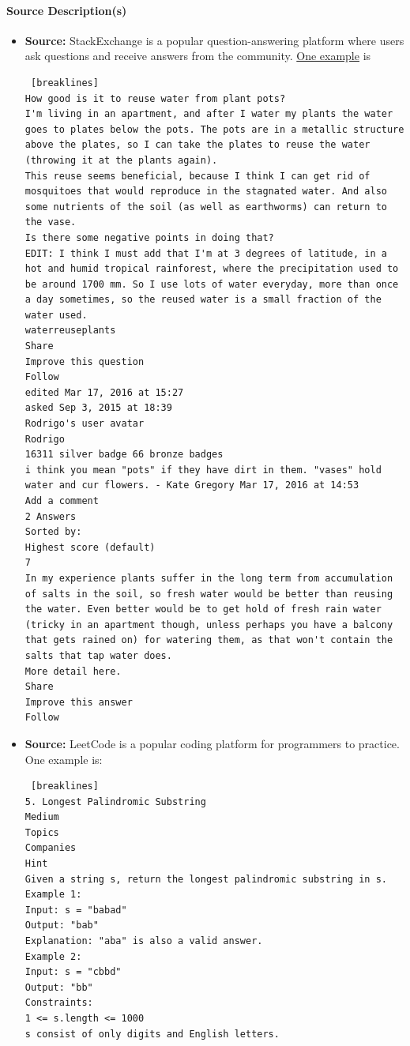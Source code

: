 \paragraph{Source Description(s)}
\begin{itemize}
\item \textbf{Source:} StackExchange is a popular question-answering platform where users ask questions and receive answers from the community. \href{https://sustainability.stackexchange.com/questions/4691/how-good-is-it-to-reuse-water-from-plant-pots}{One example} is
\begin{lstlisting} [breaklines]
How good is it to reuse water from plant pots?
I'm living in an apartment, and after I water my plants the water goes to plates below the pots. The pots are in a metallic structure above the plates, so I can take the plates to reuse the water (throwing it at the plants again).
This reuse seems beneficial, because I think I can get rid of mosquitoes that would reproduce in the stagnated water. And also some nutrients of the soil (as well as earthworms) can return to the vase.
Is there some negative points in doing that?
EDIT: I think I must add that I'm at 3 degrees of latitude, in a hot and humid tropical rainforest, where the precipitation used to be around 1700 mm. So I use lots of water everyday, more than once a day sometimes, so the reused water is a small fraction of the water used.
waterreuseplants
Share
Improve this question
Follow
edited Mar 17, 2016 at 15:27
asked Sep 3, 2015 at 18:39
Rodrigo's user avatar
Rodrigo
16311 silver badge 66 bronze badges
i think you mean "pots" if they have dirt in them. "vases" hold water and cur flowers. - Kate Gregory Mar 17, 2016 at 14:53
Add a comment
2 Answers
Sorted by:
Highest score (default)
7
In my experience plants suffer in the long term from accumulation of salts in the soil, so fresh water would be better than reusing the water. Even better would be to get hold of fresh rain water (tricky in an apartment though, unless perhaps you have a balcony that gets rained on) for watering them, as that won't contain the salts that tap water does.
More detail here.
Share
Improve this answer
Follow
\end{lstlisting}
\item \textbf{Source:} LeetCode is a popular coding platform for programmers to practice. One example is:
\begin{lstlisting} [breaklines]
5. Longest Palindromic Substring
Medium
Topics
Companies
Hint
Given a string s, return the longest palindromic substring in s.
Example 1:
Input: s = "babad"
Output: "bab"
Explanation: "aba" is also a valid answer.
Example 2:
Input: s = "cbbd"
Output: "bb"
Constraints:
1 <= s.length <= 1000
s consist of only digits and English letters.
\end{lstlisting}


\end{itemize}
